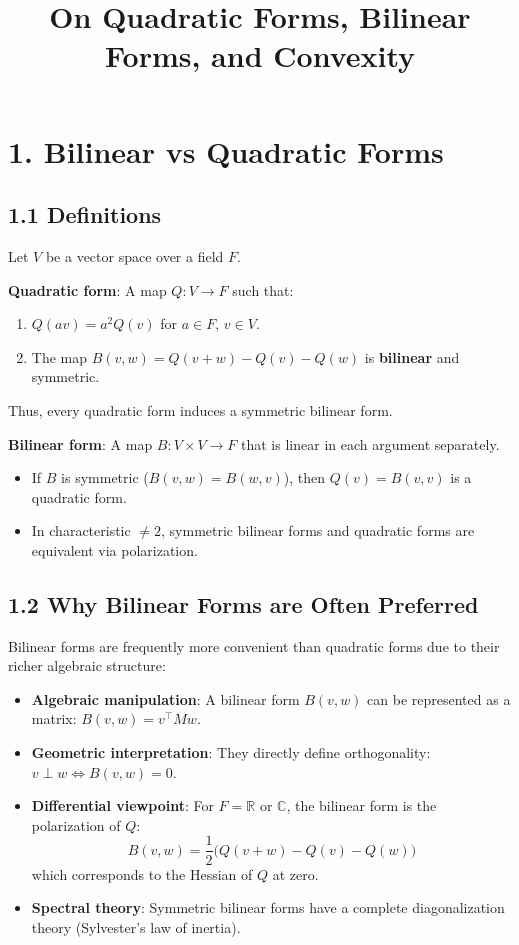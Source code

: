 \documentclass{article}
\title{On Quadratic Forms, Bilinear Forms, and Convexity}
\author{}
\date{}
\begin{document}
\maketitle

\section*{1. Bilinear vs Quadratic Forms}

\subsection*{1.1 Definitions}
Let $V$ be a vector space over a field $F$.

\textbf{Quadratic form}: A map $Q \colon V \to F$ such that:
\begin{enumerate}
    \item $Q(av) = a^2 Q(v)$ for $a \in F$, $v \in V$.
    \item The map $B(v,w) = Q(v+w) - Q(v) - Q(w)$ is \textbf{bilinear} and symmetric.
\end{enumerate}
Thus, every quadratic form induces a symmetric bilinear form.

\textbf{Bilinear form}: A map $B \colon V \times V \to F$ that is linear in each argument separately.
\begin{itemize}
    \item If $B$ is symmetric ($B(v,w) = B(w,v)$), then $Q(v) = B(v,v)$ is a quadratic form.
    \item In characteristic $\neq 2$, symmetric bilinear forms and quadratic forms are equivalent via polarization.
\end{itemize}

\subsection*{1.2 Why Bilinear Forms are Often Preferred}
Bilinear forms are frequently more convenient than quadratic forms due to their richer algebraic structure:

\begin{itemize}
    \item \textbf{Algebraic manipulation}: A bilinear form $B(v,w)$ can be represented as a matrix: $B(v,w) = v^\top M w$.
    \item \textbf{Geometric interpretation}: They directly define orthogonality: $v \perp w \iff B(v,w) = 0$.
    \item \textbf{Differential viewpoint}: For $F = \mathbb{R}$ or $\mathbb{C}$, the bilinear form is the polarization of $Q$:
    \[
    B(v,w) = \frac{1}{2} \big( Q(v+w) - Q(v) - Q(w) \big)
    \]
    which corresponds to the Hessian of $Q$ at zero.
    \item \textbf{Spectral theory}: Symmetric bilinear forms have a complete diagonalization theory (Sylvester's law of inertia).
\end{itemize}
\end{document}
